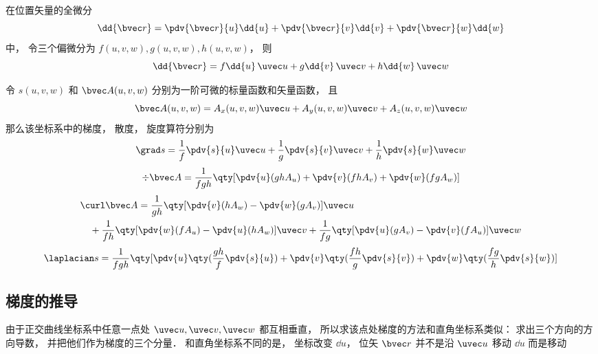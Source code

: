 

在位置矢量的全微分
\begin{equation}
\dd{\bvec r} = \pdv{\bvec r}{u}\dd{u} + \pdv{\bvec r}{v}\dd{v} + \pdv{\bvec r}{w}\dd{w}
\end{equation}
中， 令三个偏微分为 $f(u,v,w), g(u,v,w), h(u,v,w)$， 则
\begin{equation}\label{CVecOp_eq4}
\dd{\bvec r} = f\dd{u}\,\uvec u + g\dd{v}\,\uvec v + h\dd{w}\,\uvec w
\end{equation}

令 $s(u, v, w)$ 和 $\bvec A(u, v, w)$ 分别为一阶可微的标量函数和矢量函数， 且
\begin{equation}
\bvec A(u, v, w) = A_x(u, v, w)\uvec u + A_y(u, v, w)\uvec v + A_z(u, v, w)\uvec w
\end{equation}
那么该坐标系中的梯度， 散度， 旋度算符分别为
\begin{equation}
\grad s = \frac{1}{f} \pdv{s}{u}\uvec u + \frac{1}{g}\pdv{s}{v} \uvec v + \frac{1}{h} \pdv{s}{w}\uvec w
\end{equation}
\begin{equation}
\div \bvec A = \frac{1}{fgh}\qty[\pdv{u}(ghA_u) + \pdv{v}(fhA_v) + \pdv{w}(fgA_w)]
\end{equation}
\begin{equation}
\begin{aligned}
&\curl \bvec A = \frac{1}{gh}\qty[\pdv{v}(hA_w) - \pdv{w}(gA_v)]\uvec u\\
&\quad + \frac{1}{fh}\qty[\pdv{w}(fA_u) - \pdv{u}(hA_w)]\uvec v
+ \frac{1}{fg}\qty[\pdv{u}(gA_v) - \pdv{v}(fA_u)]\uvec w
\end{aligned}
\end{equation}
\begin{equation}\label{CVecOp_eq6}
\laplacian s = \frac{1}{fgh}\qty[\pdv{u}\qty(\frac{gh}{f}\pdv{s}{u}) + \pdv{v}\qty(\frac{fh}{g}\pdv{s}{v}) + \pdv{w}\qty(\frac{fg}{h}\pdv{s}{w})]
\end{equation}

\subsection{梯度的推导}
由于正交曲线坐标系中任意一点处 $\uvec u, \uvec v, \uvec w$ 都互相垂直， 所以求该点处梯度的方法和直角坐标系类似： 求出三个方向的方向导数， 并把他们作为梯度的三个分量． 和直角坐标系不同的是， 坐标改变 $\dd{u}$， 位矢 $\bvec r$ 并不是沿 $\uvec u$ 移动 $\dd{u}$ 而是移动


